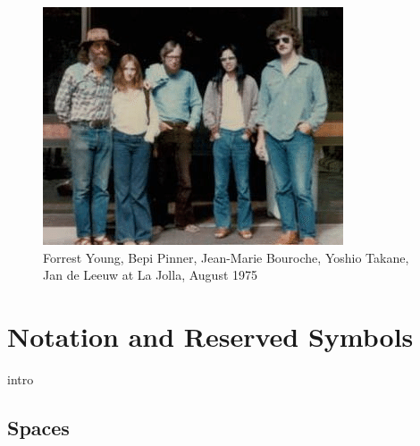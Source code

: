 \documentclass[
  12pt,
  letterpaper,
  DIV=11,
  numbers=noendperiod]{scrreprt}
\theoremstyle{remark}
\begin{document}
\begin{figure}[H]

{\centering \includegraphics{graphics/lajolla_08_75.png}

}

\caption{Forrest Young, Bepi Pinner, Jean-Marie Bouroche, Yoshio Takane,
Jan de Leeuw at La Jolla, August 1975}

\end{figure}%


\chapter*{Notation and Reserved
Symbols}\label{notation-and-reserved-symbols}


intro

\section*{Spaces}\label{spaces}

\end{document}

